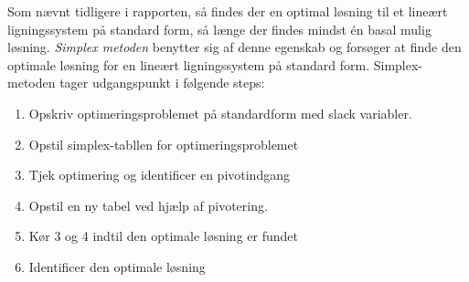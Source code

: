 Som nævnt tidligere i rapporten, så findes der en optimal løsning til et lineært ligningssystem på standard form, så længe der findes mindst én basal mulig løsning. 
\textit{Simplex metoden} benytter sig af denne egenskab og forsøger at finde den optimale løsning for en lineært ligningssystem på standard form.
%
%
%
%
%
%
%
%
%
Simplex-metoden tager udgangspunkt i følgende steps: 
%
\begin{col}{}{}
%
\begin{enumerate}
\item Opskriv optimeringsproblemet på standardform med slack variabler.  %
\item Opstil simplex-tabllen for optimeringsproblemet					 %
\item Tjek optimering og identificer en pivotindgang					 %
\item Opstil en ny tabel ved hjælp af pivotering. 						 %
\item Kør 3 og 4 indtil den optimale løsning er fundet 					 %
\item Identificer den optimale løsning									 %
\end{enumerate}
%
\end{col}
